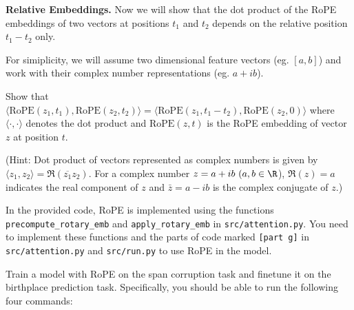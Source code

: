 \begin{parts}
\begin{subparts}
\subpart[1] \textbf{Relative Embeddings.} Now we will show that the dot product of the RoPE embeddings of two vectors at positions $t_1$ and $t_2$ depends on the relative position $t_1 - t_2$ only. 

For simiplicity, we will assume two dimensional feature vectors (eg. $[a, b]$) and work with their complex number representations (eg. $a + ib$).

Show that $\langle \text{RoPE}(z_1, t_1), \text{RoPE}(z_2, t_2) \rangle = \langle \text{RoPE}(z_1, t_1 - t_2), \text{RoPE}(z_2, 0) \rangle$ where $\langle \cdot, \cdot \rangle$ denotes the dot product and $\text{RoPE}(z, t)$ is the RoPE embedding of vector $z$ at position $t$.

(Hint: Dot product of vectors represented as complex numbers is given by $\langle z_1, z_2 \rangle = \Re(\overline{z_1} z_2)$. For a complex number $z = a + ib\ (a,b\in\R$), $\Re(z) = a$ indicates the real component of $z$ and $\bar{z} = a - ib$ is the complex conjugate of $z$.)



\subpart[8] In the provided code, RoPE is implemented using the functions \texttt{precompute\_rotary\_emb} and \texttt{apply\_rotary\_emb} in \texttt{src/attention.py}. You need to implement these functions and the parts of code marked \texttt{[part g]} in \texttt{src/attention.py} and \texttt{src/run.py} to use RoPE in the model.

Train a model with RoPE on the span corruption task and finetune it on the birthplace prediction task. Specifically, you should be able to run the following four commands:


\end{subparts}
\end{parts}
